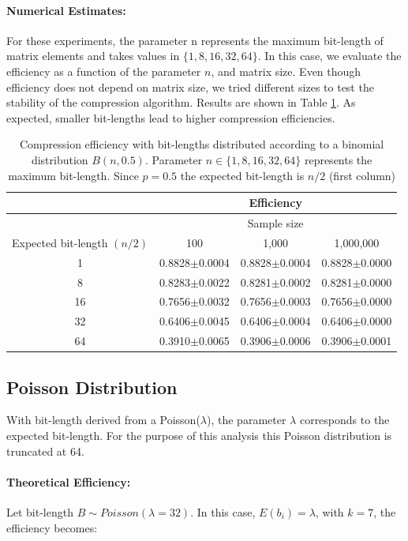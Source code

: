 \documentclass[10pt]{article}
\begin{document}
\paragraph{Numerical Estimates:}
For these experiments, the parameter n represents the maximum bit-length of matrix elements and takes values in $\{1, 8, 16, 32, 64\}$. In this case, we evaluate the efficiency as a function of the parameter $n$, and matrix size. Even though efficiency does not depend on matrix size, we tried different sizes to test the stability of the compression algorithm. Results are shown in Table \ref{tab:04}. As expected, smaller bit-lengths lead to higher compression efficiencies.


\begin{table}[h]
  \centering
  \caption{Compression efficiency with bit-lengths distributed according to a binomial distribution $B(n,0.5)$. Parameter $n \in \{1, 8, 16, 32, 64 \} $ represents the maximum bit-length. Since $p=0.5$ the expected bit-length is $n/2$ (first column)}
   \begin{tabular}{cccc}
     \hline
     & &Efficiency& \\
     \hline
     & &Sample size& \\
     Expected bit-length $(n/2)$ &100 &1,000 &1,000,000 \\
     \hline
     1 &0.8828$\pm$0.0004&0.8828$\pm$0.0004&0.8828$\pm$0.0000\\ 
     8 &0.8283$\pm$0.0022&0.8281$\pm$0.0002&0.8281$\pm$0.0000\\ 
     16&0.7656$\pm$0.0032&0.7656$\pm$0.0003&0.7656$\pm$0.0000\\ 
     32&0.6406$\pm$0.0045&0.6406$\pm$0.0004&0.6406$\pm$0.0000\\ 
     64&0.3910$\pm$0.0065&0.3906$\pm$0.0006&0.3906$\pm$0.0001\\
     \hline
  \end{tabular}
  \label{tab:04}
\end{table}

\subsection*{Poisson Distribution}
With bit-length derived from a Poisson($\lambda$), the parameter $\lambda$ corresponds to the expected bit-length. For the purpose of this analysis this Poisson distribution is truncated at 64. 
\paragraph{Theoretical Efficiency:}
Let bit-length $B \sim Poisson(\lambda=32)$. In this case, $E(b_i) = \lambda$, with $k=7$,  the efficiency becomes:
\end{document}
